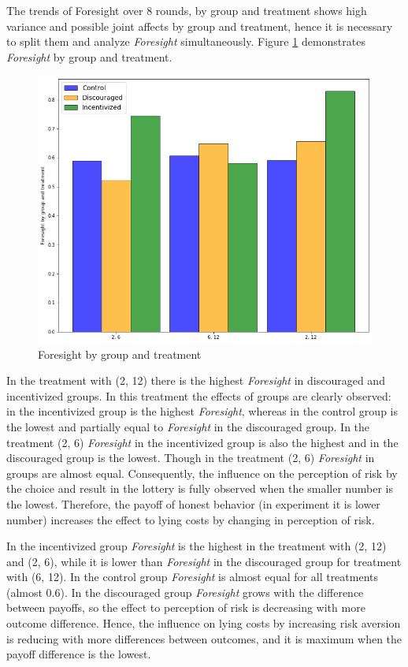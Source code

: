 \documentclass[12pt]{article}
\begin{document}
 	The trends of Foresight over 8 rounds, by group and treatment shows high variance and possible joint affects by group and treatment, hence it is necessary to split them and analyze \textit{Foresight} simultaneously. Figure \ref{main_hist} demonstrates \textit{Foresight} by group and treatment.
 	
	\begin{figure}[!h]
		\caption{Foresight by group and treatment }
		\label{main_hist}
		\includegraphics[scale=0.58]{num_person.png}
	\end{figure}
	
	In the treatment with (2, 12) there is the highest \textit{Foresight} in discouraged and incentivized groups. In this treatment the effects of groups are clearly observed: in the incentivized group is the highest \textit{Foresight}, whereas in the control group is the lowest and partially equal to \textit{Foresight} in the discouraged group. In the treatment (2, 6) \textit{Foresight} in the incentivized group is also the highest and in the discouraged group is the lowest. Though in the treatment (2, 6) \textit{Foresight} in groups are almost equal. Consequently, the influence on the perception of risk by the choice and result in the lottery is fully observed when the smaller number is the lowest. Therefore, the payoff of honest behavior (in experiment it is lower number) increases the effect to lying costs by changing in perception of risk. 

	In the incentivized group \textit{Foresight} is the highest in the treatment with (2, 12) and (2, 6), while it is lower than \textit{Foresight} in the discouraged group for treatment with (6, 12). In the control group \textit{Foresight} is almost equal for all treatments (almost 0.6). In the discouraged group \textit{Foresight} grows with the difference between payoffs, so the effect to perception of risk is decreasing with more outcome difference. Hence, the influence on lying costs by increasing risk aversion is reducing with more differences between outcomes, and it is maximum when the payoff difference is the lowest.

	
	\printbibliography

	
\end{document}
